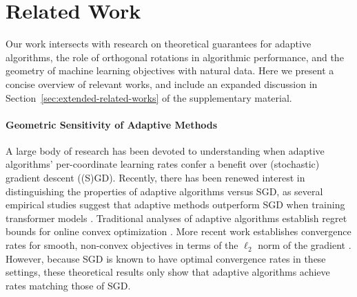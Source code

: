 \section{Related Work}
\label{ssec:related-work}

Our work intersects with research on theoretical guarantees for adaptive algorithms, the role of orthogonal rotations in algorithmic performance, and the geometry of machine learning objectives with natural data. Here we present a concise overview of relevant works, and include an expanded discussion in Section~\ref{sec:extended-related-works} of the supplementary material. 

\paragraph{Geometric Sensitivity of Adaptive Methods} A large body of research has been devoted to understanding when adaptive algorithms' per-coordinate learning rates confer a benefit over (stochastic) gradient descent ((S)GD). Recently, there has been renewed interest in distinguishing the properties of adaptive algorithms versus SGD, as several empirical studies suggest that adaptive methods outperform SGD when training transformer models \cite{kunstner2024heavy,zhang2024transformers}. Traditional analyses of adaptive algorithms establish regret bounds for online convex optimization \cite{duchi2011adaptive, hazan2016introduction}. More recent work establishes convergence rates for smooth, non-convex objectives in terms of the $\ell_2$ norm of the gradient \cite{defossez2020simple,ward2020adagrad}. However, because SGD is known to have optimal convergence rates in these settings, these theoretical results only show that adaptive algorithms achieve rates matching those of SGD.

